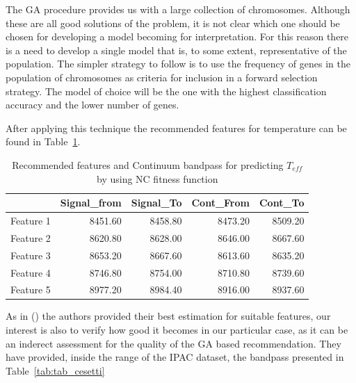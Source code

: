{
The GA procedure provides us with a large collection of chromosomes.
Although these are all good solutions of the problem, it is not clear which one
should be chosen for developing a model becoming for interpretation. 
For this reason there is a need to
develop a single model that is, to some extent, representative of the
population. The simpler strategy to follow is to use the frequency of genes in
the population of chromosomes as criteria for inclusion in a forward selection
strategy. The model of choice will be the one with the highest classification
accuracy and the lower number of genes.

After applying this technique the recommended features for temperature 
can be found in Table~\ref{tab:tab_NC_T}. 

\begin{table}
\begin{center}
\begin{tabular}{rrrrr}
  \hline
 & Signal\_from & Signal\_To & Cont\_From & Cont\_To \\ 
  \hline
Feature 1 & 8451.60 & 8458.80 & 8473.20 & 8509.20 \\ 
Feature 2 & 8620.80 & 8628.00 & 8646.00 & 8667.60 \\ 
Feature 3 & 8653.20 & 8667.60 & 8613.60 & 8635.20 \\ 
Feature 4 & 8746.80 & 8754.00 & 8710.80 & 8739.60 \\ 
Feature 5 & 8977.20 & 8984.40 & 8916.00 & 8937.60 \\ 
   \hline
\end{tabular}
\caption {Recommended features and Continuum bandpass for predicting $T_{eff}$ 
      by using NC fitness function} \label{tab:tab_NC_T} 
\end{center}
\end{table}

As in (\cite{2013A&A...549A.129C}) the authors provided their 
best estimation for suitable features, our interest is also to verify how
good it becomes in our particular case, as 
it can be an inderect assessment for the quality of the GA based recommendation. 
They have provided, inside the range of the IPAC dataset, the 
bandpass presented in Table~\ref{tab:tab_cesetti}

}
